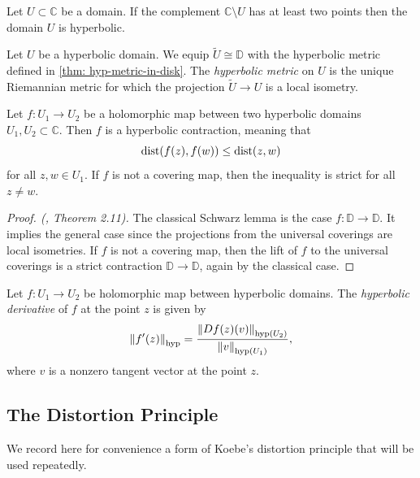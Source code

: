 \begin{theorem}\label{thm:criterion-hyperbolic-domain}
	Let $U \subset \mathbb C$ be a domain. If the complement $\mathbb C \setminus U$ has at least two points
	then the domain $U$ is hyperbolic.
\end{theorem}

\begin{definition}
	Let $U$ be a hyperbolic domain. We equip $\tilde U \cong \mathbb{D}$ with the hyperbolic metric defined in \cref{thm: hyp-metric-in-disk}.
	The \emph{hyperbolic metric} on $U$ is the unique Riemannian metric for which the projection 
	$\tilde U \to U$ is a local isometry.
\end{definition}

\begin{theorem} \label{thm:Schwarz}
	Let $f:U_1 \to U_2$ be a holomorphic map between two hyperbolic domains $U_1,U_2 \subset \mathbb C$.
	Then $f$ is a hyperbolic contraction, meaning that
	\begin{equation}
		\operatorname{dist}(f(z),f(w)) \leq \operatorname{dist} (z,w)
	\end{equation}
	for all $z,w \in U_1$. If $f$ is not a covering map, then the inequality is strict for all $z \neq w$.
\end{theorem}

\begin{proof}[Proof. (\cite{milnor_book}, Theorem 2.11)]
	The classical Schwarz lemma is the case $f:\mathbb D \to \mathbb D$.
	It implies the general case since the projections from the universal coverings 
	are local isometries.
	If $f$ is not a covering map, then the lift of $f$
	to the universal coverings is a strict contraction $\mathbb D \to \mathbb D$, 
	again by the classical case.
\end{proof}

\begin{definition}
	Let $f:U_1\to U_2$ be holomorphic map between hyperbolic domains. The \emph{hyperbolic derivative} of $f$ at the point $z$ 
	is given by
	\begin{equation} \label{def:hyp-derivative}
		\left\Vert f'(z)\right\Vert_{\operatorname{hyp}} = 
		\frac{\left\Vert Df(z)(v)\right\Vert_{\operatorname{hyp}(U_2)}}
		{\left\Vert v\right\Vert_{\operatorname{hyp}(U_1)}},
	\end{equation}
	where $v$ is a nonzero tangent vector at the point $z$.
\end{definition}

\subsection{The Distortion Principle}
We record here for convenience a form of Koebe's distortion principle that will be used repeatedly. 

